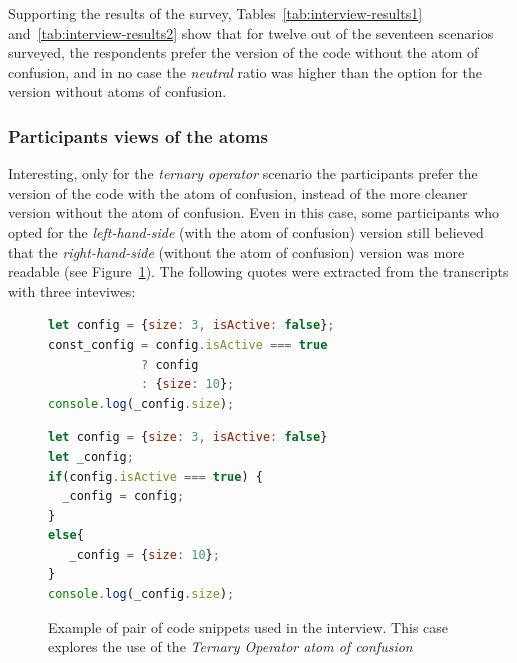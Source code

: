 Supporting the results of the survey, Tables~\ref{tab:interview-results1}
and~\ref{tab:interview-results2} show that for twelve out of the
seventeen scenarios surveyed, the respondents prefer the version of the
code without the atom of confusion, and in no case the \emph{neutral}
ratio was higher than the option for the version without atoms of confusion.

\subsubsection*{Participants views of the atoms} Interesting,
only for the \emph{ternary operator} scenario the participants
prefer the version of the code with the atom of confusion,
instead of the more cleaner version without the atom of confusion.
Even in this case, some participants who opted for
the \emph{left-hand-side} (with the atom of confusion) version
still believed that the \emph{right-hand-side} (without the atom of
confusion) version was more readable (see Figure~\ref{code:ternary}). 
The following quotes were extracted from the transcripts with
three inteviwes:

\begin{figure}

\noindent\begin{minipage}{.45\textwidth}
\begin{lstlisting}[language=JavaScript, caption=\emph{Left-hand side} (using the \emph{Ternary Operator} atom)]
let config = {size: 3, isActive: false};
const_config = config.isActive === true 
             ? config 
             : {size: 10};
console.log(_config.size);
\end{lstlisting}
\end{minipage}\hfill
\begin{minipage}{.45\textwidth}
\begin{lstlisting}[language=JavaScript, caption=\emph{Right-hand side} (without the atom)]
let config = {size: 3, isActive: false}
let _config;
if(config.isActive === true) {
  _config = config;
}
else{
   _config = {size: 10};
}
console.log(_config.size);
\end{lstlisting}
\end{minipage}
\caption{Example of pair of code snippets used in the interview. This case explores the use of the \emph{Ternary Operator atom of confusion}}
\label{code:ternary}
\end{figure}

